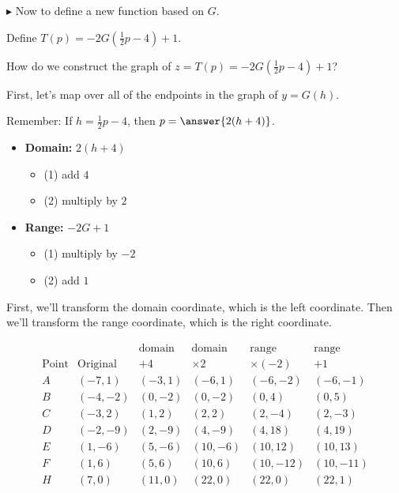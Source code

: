 \documentclass{ximera}
\begin{document}
\begin{example}
$\blacktriangleright$ Now to define a new function based on $G$.






Define  $T(p) = -2G\left( \frac{1}{2} p - 4 \right) + 1$.


How do we construct the graph of $z = T(p) = -2G\left(\frac{1}{2} p - 4\right) + 1$?

First, let's map over all of the endpoints in the graph of $y = G(h)$.

Remember: If  $h = \frac{1}{2} p - 4$, then $p = \answer{2(h+4)}$.

\begin{itemize}
 \item \textbf{Domain:}  $2 (h+4)$ 
    \begin{itemize}
      \item (1) add $4$
      \item (2) multiply by $2$
    \end{itemize}

 \item \textbf{Range:}  $-2 G + 1$ 
    \begin{itemize}
      \item (1) multiply by $-2$
      \item (2) add $1$
    \end{itemize}
\end{itemize}


First, we'll transform the domain coordinate, which is the left coordinate.  Then we'll transform the range coordinate, which is the right coordinate.

\[
\begin{array}{c|l|l|l|l|l}
        &         &  \text{domain}  &  \text{domain}    &  \text{range}   & \text{range}         \\
\text{Point}    &  \text{Original}  &  +4           &  \times2   &  \times(-2)  & + 1          \\
\hline
A   &   (-7, 1)          &  (-3, 1)      &  (-6, 1)     &  (-6, -2)    &  (-6,-1)     \\
B   &   (-4, -2)         &  (0, -2)      &  (0, -2)     &  (0,4)      &  (0,5)       \\
C   &   (-3,2)           &  (1,2)        &  (2,2)       &  (2,-4)     &  (2,-3)     \\
D   &   (-2,-9)          &  (2, -9)      &  (4,-9)      &  (4, 18)    &  (4,19)      \\
E   &   (1,-6)           &  (5,-6)       &  (10,-6)     &  (10,12)    &  (10,13)     \\
F   &   (1,6)            &  (5, 6)       &  (10,6)      &  (10,-12)   &  (10,-11)   \\
H   &   (7,0)            &  (11,0)       &  (22,0)      &  (22,0)     &  (22,1)
\end{array}
\]





\end{example}
\end{document}
